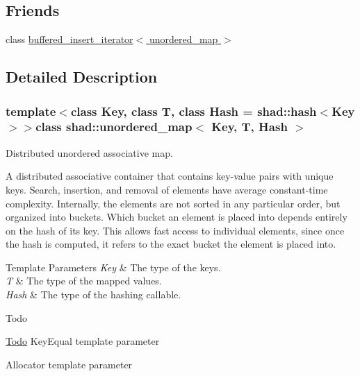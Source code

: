 \subsection*{Friends}
\begin{DoxyCompactItemize}
\item 
class \hyperlink{classshad_1_1unordered__map_a178983bb5902294d2c70ed8b802b4a03}{buffered\-\_\-insert\-\_\-iterator$<$ unordered\-\_\-map $>$}
\end{DoxyCompactItemize}


\subsection{Detailed Description}
\subsubsection*{template$<$class Key, class T, class Hash = shad\-::hash$<$\-Key$>$$>$class shad\-::unordered\-\_\-map$<$ Key, T, Hash $>$}

Distributed unordered associative map. 

A distributed associative container that contains key-\/value pairs with unique keys. Search, insertion, and removal of elements have average constant-\/time complexity. Internally, the elements are not sorted in any particular order, but organized into buckets. Which bucket an element is placed into depends entirely on the hash of its key. This allows fast access to individual elements, since once the hash is computed, it refers to the exact bucket the element is placed into.


\begin{DoxyTemplParams}{Template Parameters}
{\em Key} & The type of the keys. \\
\hline
{\em T} & The type of the mapped values. \\
\hline
{\em Hash} & The type of the hashing callable.\\
\hline
\end{DoxyTemplParams}
\begin{DoxyRefDesc}{Todo}
\item[\hyperlink{todo__todo000001}{Todo}]Key\-Equal template parameter 

Allocator template parameter \end{DoxyRefDesc}



